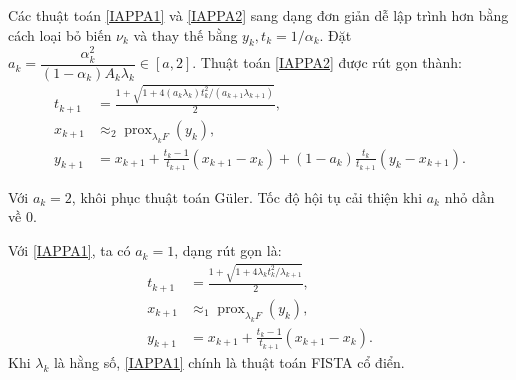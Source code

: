 Các thuật toán \eqref{IAPPA1} và \eqref{IAPPA2} sang dạng đơn giản dễ lập trình hơn bằng cách loại bỏ biến \(\nu_k\) và thay thế bằng \(y_k, t_k = 1/\alpha_k\).
Đặt \(a_k = \dfrac{\alpha_k^2}{(1-\alpha_k)A_k\lambda_k} \in [a, 2]\). Thuật toán \eqref{IAPPA2} được rút gọn thành:
\begin{align*}
    t_{k+1} &= \frac{1 + \sqrt{1 + 4(a_k\lambda_k)t_k^2/(a_{k+1}\lambda_{k+1})}}{2}, \\
    x_{k+1} &\approx_2 \operatorname{prox}_{\lambda_k F}(y_k), \\
    y_{k+1} &= x_{k+1} + \frac{t_k - 1}{t_{k+1}}(x_{k+1} - x_k) + (1-a_k)\frac{t_k}{t_{k+1}}(y_k - x_{k+1}).
\end{align*}
\begin{remark}
    Với \(a_k = 2\), khôi phục thuật toán Güler. Tốc độ hội tụ cải thiện khi \(a_k\) nhỏ dần về 0.
\end{remark}
Với \eqref{IAPPA1}, ta có \(a_k = 1\), dạng rút gọn là:
\begin{align*}
    t_{k+1} &= \frac{1 + \sqrt{1 + 4\lambda_k t_k^2/\lambda_{k+1}}}{2}, \\
    x_{k+1} &\approx_1 \operatorname{prox}_{\lambda_k F}(y_k), \\
    y_{k+1} &= x_{k+1} + \frac{t_k - 1}{t_{k+1}}(x_{k+1} - x_k).
\end{align*}
Khi \(\lambda_k\) là hằng số, \eqref{IAPPA1} chính là thuật toán FISTA cổ điển.
